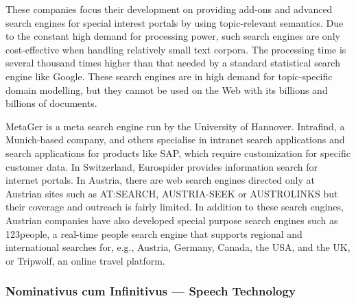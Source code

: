 \documentclass[]{../metanetpaper}
\begin{document}
\begin{Parallel}[c]{80mm}{80mm}
{    These companies focus their development on providing add-ons and advanced search engines for special interest portals by using topic-relevant semantics. Due to the constant high demand for processing power, such search engines are only cost-effective when handling relatively small text corpora. The processing time is several thousand times higher than that needed by a standard statistical search engine like Google. These search engines are in high demand for topic-specific domain modelling, but they cannot be used on the Web with its billions and billions of documents.

    MetaGer is a meta search engine run by the University of Hannover. Intrafind, a Munich-based company, and others specialise in intranet search applications and search applications for products like SAP, which require customization for specific customer data. In Switzerland, Eurospider provides information search for internet portals. In Austria, there are web search engines directed only at Austrian sites such as AT:SEARCH, AUSTRIA-SEEK or AUSTROLINKS but their coverage and outreach is fairly limited. In addition to these search engines, Austrian companies have also developed special purpose search engines such as 123people, a real-time people search engine that supports regional and international searches for, e.g., Austria, Germany, Canada, the USA, and the UK, or Tripwolf, an online travel platform.
  }
  
  \ParallelPar


  \subsubsection{Nominativus cum Infinitivus --- Speech Technology}


\end{Parallel}
\end{document}
